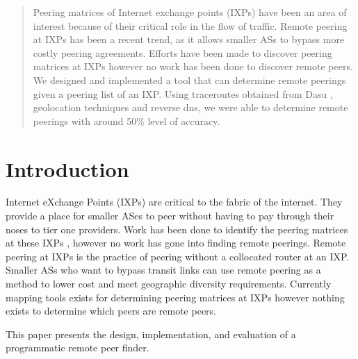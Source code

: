 \documentclass{acm_proc_article-sp}
\begin{document}
\maketitle
\begin{abstract}
Peering matrices of Internet exchange points (IXPs) have been an area of interest because of their
critical role in the flow of traffic. \cite{Augustin:2009}
Remote peering at IXPs has been a recent trend, as it allows smaller ASs to bypass more costly 
peering agreements.
Efforts have been made to discover peering matrices at IXPs however no work has been done 
to discover remote peers. We designed and implemented a tool that can determine remote peerings
given a peering list of an IXP. Using traceroutes obtained from Dasu \cite{Sanchez:2011}, geolocation
techniques and reverse dns, we were able to determine remote peerings with 
around 50\% level of accuracy.
\end{abstract}




\section{Introduction}

Internet eXchange Points (IXPs) are critical to the fabric of the internet. They provide a place 
for smaller ASes to peer without having to pay through their noses to tier one providers. Work has
    been done to identify the peering matrices at these IXPs \cite{Augustin:2009}, however no work has 
    gone into finding remote peerings.
Remote peering at IXPs is the practice of peering without a collocated router at an IXP. Smaller ASs
who want to bypass transit links can use remote peering as a method to lower cost and meet geographic 
diversity requirements. Currently mapping tools exists for determining peering matrices at 
IXPs however nothing exists to determine which peers are remote peers.

This paper presents the design, implementation, and evaluation of a programmatic remote peer finder.
\end{document}
